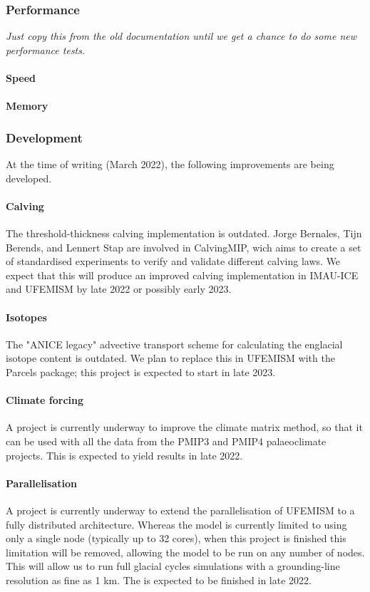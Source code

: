 \documentclass{article}
\begin{document}
\subsubsection{Performance}

\textit{Just copy this from the old documentation until we get a chance to do some new performance tests.}

\paragraph{Speed}
\paragraph{Memory}

\newpage
\subsubsection{Development}

At the time of writing (March 2022), the following improvements are being developed.

\paragraph{Calving}
The threshold-thickness calving implementation is outdated. Jorge Bernales, Tijn Berends, and Lennert Stap are involved in CalvingMIP, wich aims to create a set of standardised experiments to verify and validate different calving laws. We expect that this will produce an improved calving implementation in IMAU-ICE and UFEMISM by late 2022 or possibly early 2023.

\paragraph{Isotopes}
The "ANICE legacy" advective transport scheme for calculating the englacial isotope content is outdated. We plan to replace this in UFEMISM with the Parcels package; this project is expected to start in late 2023.

\paragraph{Climate forcing}
A project is currently underway to improve the climate matrix method, so that it can be used with all the data from the PMIP3 and PMIP4 palaeoclimate projects. This is expected to yield results in late 2022.

\paragraph{Parallelisation}
A project is currently underway to extend the parallelisation of UFEMISM to a fully distributed architecture. Whereas the model is currently limited to using only a single node (typically up to 32 cores), when this project is finished this limitation will be removed, allowing the model to be run on any number of nodes. This will allow us to run full glacial cycles simulations with a grounding-line resolution as fine as 1 km. The is expected to be finished in late 2022.
\end{document}
